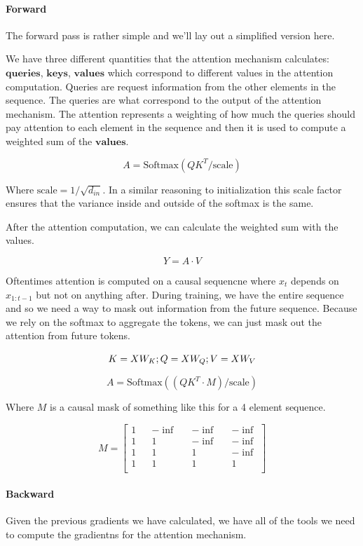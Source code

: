 \documentclass{article}
\begin{document}
\paragraph*{Forward} The forward pass is rather simple and we'll lay out
a simplified version here.

We have three different quantities that the attention mechanism calculates:
$\textbf{queries}$, $\textbf{keys}$, $\textbf{values}$ which correspond to
different values in the attention computation. Queries are request information
from the other elements in the sequence. The queries are what correspond to
the output of the attention mechanism. The attention represents a weighting
of how much the queries should pay attention to each element in the sequence
and then it is used to compute a weighted sum of the $\textbf{values}$.

$$
A = \text{Softmax}\left(Q K^T / \text{scale}\right)
$$

Where $\text{scale} = 1 / \sqrt{d_{in}}$. In a similar reasoning to initialization
this scale factor ensures that the variance inside and outside of the softmax
is the same.

After the attention computation, we can calculate the weighted sum with the
values.

$$
Y = A \cdot V
$$

Oftentimes attention is computed on a causal sequencne where $x_t$ depends
on $x_{1:t-1}$ but not on anything after. During training, we have the entire
sequence and so we need a way to mask out information from the future sequence.
Because we rely on the softmax to aggregate the tokens, we can just mask out
the attention from future tokens.

$$
K = XW_K; \space Q = XW_Q; \space V = XW_V
$$

$$
A = \text{Softmax}\left((Q K^T  \cdot M) / \text{scale}\right)
$$

Where $M$ is a causal mask of something like this for a 4 element sequence.

$$
M = \begin{bmatrix}
    1 && -\inf && -\inf && -\inf \\
    1 && 1 && -\inf && -\inf \\
    1 && 1 && 1 && -\inf \\
    1 && 1 && 1 && 1 \\
    \end{bmatrix} 
$$   

\paragraph*{Backward} Given the previous gradients we have calculated,
we have all of the tools we need to compute the gradientns for the
attention mechanism.
\end{document}
